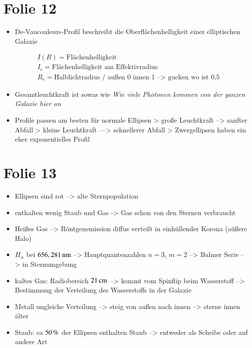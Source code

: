\section{Folie 12}

\begin{itemize}
\item De-Vaucouleurs-Profil beschreibt die Oberflächenhelligkeit einer elliptischen Galaxie
\end{itemize}

\begin{align*}
&I(R) = \text{Flächenhelligkeit} \\
&I_e = \text{Flächenhelligkeit am Effektivradius} \\
&R_e = \text{Halblichtradius / außen 0 innen 1 --> gucken wo ist 0,5}
\end{align*}


\begin{itemize}
\item Gesamtleuchtkraft ist sowas wie \textit{Wie viele Photonen kommen von der ganzen Galaxie hier an}
\item Profile passen am besten für normale Ellipsen
\subitem > große Leuchtkraft --> sanfter Abfall
\subitem > kleine Leuchtkraft ---> schnellerer Abfall
\subitem > Zwergellipsen haben ein eher exponentielles Profil
\end{itemize}


\section{Folie 13}

\begin{itemize}
\item Ellipsen sind rot --> alte Sternpopulation
\item enthalten wenig Staub und Gas -> Gas schon von den Sternen verbraucht
\item Heißes Gas --> Röntgenemission diffus verteilt in einhüllender Korona (aüßere Halo)
\item $H_\alpha$ bei $\unit[656,281]{nm}$ -->  Hauptquantenzahlen $n=3$, $m=2$ --> Balmer Serie --> in Sternumgebung
\item kaltes Gas: Radiobereich $\unit[21]{cm}$ --> kommt vom Spinflip beim Wasserstoff --> Bestimmung der Verteilung des Wasserstoffs in der Galaxie
\item Metall ungleiche Verteilung --> steig von außen nach innen --> sterne innen älter
\item Staub: ca $\unit[50]{\%}$ der Ellipsen enthalten Staub --> entweder als Scheibe oder auf andere Art
\end{itemize}


